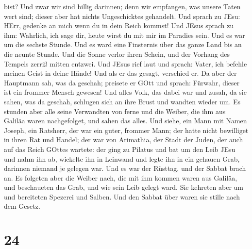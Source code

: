 bist?  Und zwar wir sind billig darinnen; denn wir
empfangen, was unsere Taten wert sind; dieser aber hat nichts
Ungeschicktes gehandelt.  Und sprach zu JEsu: HErr, gedenke
an mich wenn du in dein Reich kommst!  Und JEsus sprach zu
ihm: Wahrlich, ich sage dir, heute wirst du mit mir im Paradies sein.
 Und es war um die sechste Stunde. Und es ward eine
Finsternis über das ganze Land bis an die neunte Stunde. 
Und die Sonne verlor ihren Schein, und der Vorhang des Tempels zerriß
mitten entzwei.  Und JEsus rief laut und sprach: Vater, ich
befehle meinen Geist in deine Hände! Und als er das gesagt, verschied
er.  Da aber der Hauptmann sah, was da geschah; preisete er
GOtt und sprach: Fürwahr, dieser ist ein frommer Mensch gewesen!
 Und alles Volk, das dabei war und zusah, da sie sahen, was
da geschah, schlugen sich an ihre Brust und wandten wieder um.
 Es stunden aber alle seine Verwandten von ferne und die
Weiber, die ihm aus Galiläa waren nachgefolget, und sahen das alles.
 Und siehe, ein Mann mit Namen Joseph, ein Ratsherr, der
war ein guter, frommer Mann;  der hatte nicht bewilliget in
ihren Rat und Handel; der war von Arimathia, der Stadt der Juden, der
auch auf das Reich GOttes wartete:  der ging zu Pilatus und
bat um den Leib JEsu  und nahm ihn ab, wickelte ihn in
Leinwand und legte ihn in ein gehauen Grab, darinnen niemand je gelegen
war.  Und es war der Rüsttag, und der Sabbat brach an.
 Es folgeten aber die Weiber nach, die mit ihm kommen waren
aus Galiläa, und beschaueten das Grab, und wie sein Leib gelegt ward.
 Sie kehreten aber um und bereiteten Spezerei und Salben.
Und den Sabbat über waren sie stille nach dem Gesetz.

\hypertarget{section-23}{%
\section{24}\label{section-23}}

